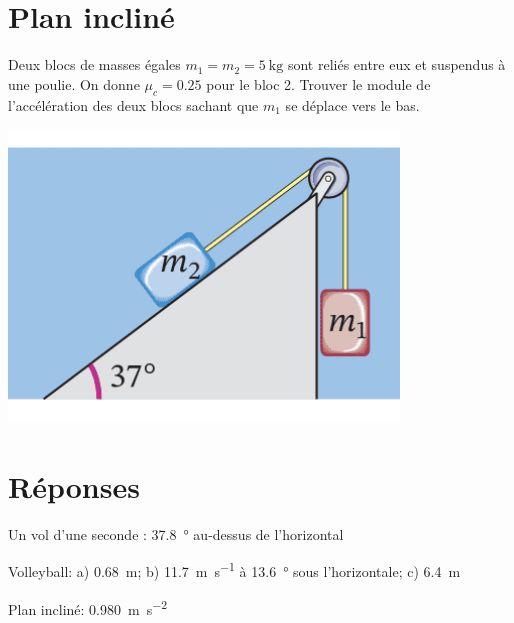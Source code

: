 \documentclass[nofonts]{tufte-handout}
\begin{document}
\section{Plan incliné}
Deux blocs de masses égales $m_1 = m_2 = \qty{5}{\kilo\gram}$ sont reliés entre
eux et suspendus à une poulie. On donne $\mu_c = \num{0.25}$ pour le bloc 2.
Trouver le module de l'accélération des deux blocs sachant que $m_1$ se déplace
vers le bas.
\begin{marginfigure}
  \includegraphics[width=\marginparwidth]{figures/benson_c6e21.png}
\end{marginfigure}


\section{Réponses}

\noindent Un vol d'une seconde : \qty{37.8}{\degree} au-dessus de l'horizontal

\noindent Volleyball: a) \qty{0.68}{\meter};
            b) \qty{11.7}{\meter\per\second} à \qty{13.6}{\degree} sous l'horizontale;
            c) \qty{6.4}{\meter}

\noindent Plan incliné: \qty{0.980}{\meter\per\second\squared}



\end{document}

